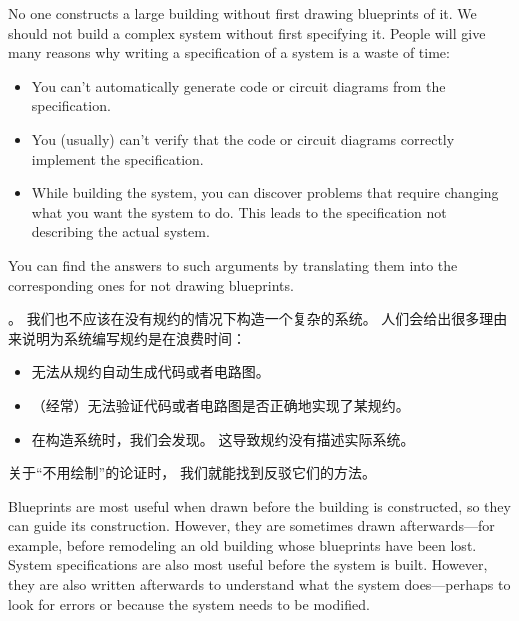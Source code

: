 \begin{en}
No one constructs a large building without first drawing blueprints of
it.  We should not build a complex system without first specifying it.
People will give many reasons why writing a specification of a
system is a waste of time:
\begin{itemize}
\item You can't automatically generate code or circuit diagrams from
the specification.

\item You (usually) can't verify that the code or circuit diagrams
correctly implement the specification.

\item While building the system, you can discover problems that
require changing what you want the system to do.  This leads to the
specification not describing the actual system.
\end{itemize}
You can find the answers to such arguments by translating them into
the corresponding ones for not drawing blueprints.
\end{en}

\begin{ch}
  。
  我们也不应该在没有规约的情况下构造一个复杂的系统。
  人们会给出很多理由来说明为系统编写规约是在浪费时间：
  \begin{itemize}
    \item 无法从规约自动生成代码或者电路图。
    \item （经常）无法验证代码或者电路图是否正确地实现了某规约。
    \item 在构造系统时，我们会发现。
      这导致规约没有描述实际系统。
  \end{itemize}
  关于``不用绘制\blueprint{}''的论证时，
  我们就能找到反驳它们的方法。
\end{ch}

\begin{en}
Blueprints are most useful when drawn before the building is
constructed, so they can guide its construction.  However, they are
sometimes drawn afterwards---for example, before remodeling an old
building whose blueprints have been lost.  System specifications are
also most useful before the system is built.  However, they are also
written afterwards to understand what the system does---perhaps to
look for errors or because the system needs to be modified.
\end{en}

